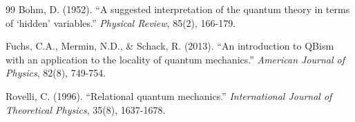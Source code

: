 \documentclass[12pt,a4paper]{article}
\begin{document}
\begin{thebibliography}{99}
Bohm, D. (1952). ``A suggested interpretation of the quantum theory in terms of `hidden' variables.'' \textit{Physical Review}, 85(2), 166-179.

Fuchs, C.A., Mermin, N.D., \& Schack, R. (2013). ``An introduction to QBism with an application to the locality of quantum mechanics.'' \textit{American Journal of Physics}, 82(8), 749-754.

Rovelli, C. (1996). ``Relational quantum mechanics.'' \textit{International Journal of Theoretical Physics}, 35(8), 1637-1678.

\end{thebibliography}
\end{document}
